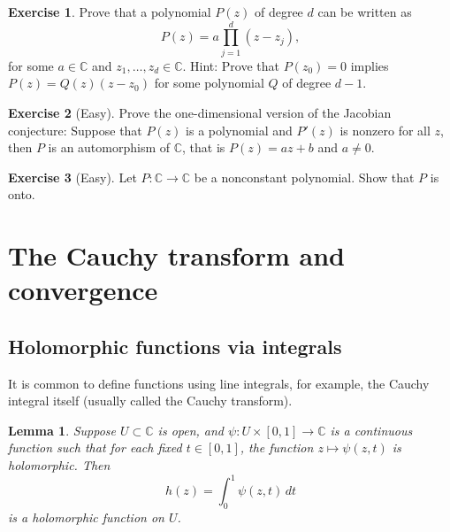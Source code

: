 \documentclass[12pt,openany]{book}
\newcommand{\C}{{\mathbb{C}}}
\theoremstyle{plain}
\newtheorem{lemma}[thm]{Lemma}
\theoremstyle{remark}
\theoremstyle{definition}
\newenvironment{exbox}{%
    \def\FrameCommand{\vrule width 1pt \relax\hspace {10pt}}%
    \MakeFramed {\advance \hsize -\width \FrameRestore }%
}{%
    \endMakeFramed
}
\theoremstyle{exercise}
\newtheorem{exercise}{Exercise}[section]
\theoremstyle{example}
\begin{document}
\begin{exbox}
\begin{exercise}
Prove that a polynomial $P(z)$ of degree $d$ can be written as
\begin{equation*}
P(z) = a \prod_{j=1}^d (z-z_j) ,
\end{equation*}
for some $a \in \C$ and $z_1,\ldots,z_d \in \C$.
Hint: Prove that $P(z_0) = 0$ implies $P(z) = Q(z) (z-z_0)$ for some
polynomial $Q$ of degree $d-1$.
\end{exercise}

\begin{exercise}[Easy]
Prove the one-dimensional version of the Jacobian conjecture:
Suppose that $P(z)$ is a polynomial and $P'(z)$ is nonzero for all $z$,
then $P$ is an automorphism of $\C$, that is $P(z) = az+b$ and $a \not= 0$.
\end{exercise}

\begin{exercise}[Easy]
Let $P \colon \C \to \C$ be a nonconstant polynomial.  Show that $P$ is
onto.
\end{exercise}
\end{exbox}


\section{The Cauchy transform and convergence}

\subsection{Holomorphic functions via integrals}

It is common to define functions using line integrals, for example,
the Cauchy integral itself (usually called the Cauchy transform).

\begin{lemma} \label{lemma:holfuncbyintegral}
Suppose $U \subset \C$ is open, and
$\psi \colon U \times [0,1] \to \C$ is a continuous function such that
for each fixed $t \in [0,1]$, the function $z \mapsto \psi(z,t)$ is
holomorphic.  Then
\begin{equation*}
h(z) =
\int_0^1 \psi(z,t) \, dt
\end{equation*}
is a holomorphic function on $U$.
\end{lemma}
\end{document}
